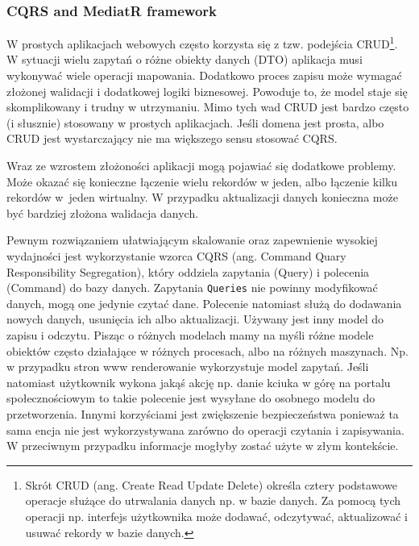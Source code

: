
\subsubsection{CQRS and MediatR framework}


W prostych aplikacjach webowych często korzysta się z tzw. podejścia CRUD\footnote{Skrót CRUD (ang. Create Read Update Delete) określa cztery podstawowe operacje służące do utrwalania danych np. w bazie danych. Za pomocą tych operacji  np. interfejs użytkownika może dodawać, odczytywać, aktualizować i usuwać rekordy w bazie danych.}. W sytuacji wielu zapytań o różne obiekty danych (DTO) aplikacja musi wykonywać wiele operacji mapowania. Dodatkowo proces zapisu może wymagać złożonej walidacji i dodatkowej logiki biznesowej. Powoduje to, że model staje się skomplikowany i trudny w utrzymaniu. Mimo tych wad CRUD jest bardzo często (i słusznie) stosowany w prostych aplikacjach. Jeśli domena jest prosta, albo CRUD jest wystarczający nie ma większego sensu stosować CQRS.
 
Wraz ze wzrostem złożoności aplikacji mogą pojawiać się dodatkowe problemy. Może okazać się konieczne łączenie wielu rekordów w jeden, albo łączenie kilku rekordów w~jeden wirtualny. W przypadku aktualizacji danych konieczna może być bardziej złożona walidacja danych. 
 
Pewnym rozwiązaniem ułatwiającym skalowanie oraz zapewnienie wysokiej wydajności jest wykorzystanie wzorca CQRS (ang. Command Quary Responsibility Segregation), który oddziela zapytania (Query) i polecenia (Command) do bazy danych. Zapytania \texttt{Queries} nie powinny modyfikować danych, mogą one jedynie czytać dane. Polecenie natomiast służą do dodawania nowych danych, usunięcia ich albo aktualizacji. Używany jest inny model do zapisu i odczytu. Pisząc o różnych modelach mamy na myśli różne modele obiektów często działające w różnych procesach, albo na różnych maszynach. Np. w przypadku stron www renderowanie wykorzystuje model zapytań. Jeśli natomiast użytkownik wykona jakąś akcję np. danie kciuka w górę na portalu społecznościowym to takie polecenie jest wysyłane do osobnego modelu do przetworzenia. Innymi korzyściami jest zwiększenie bezpieczeństwa ponieważ ta sama encja nie jest wykorzystywana zarówno do operacji czytania i zapisywania. W przeciwnym przypadku informacje mogłyby zostać użyte w złym kontekście. 

